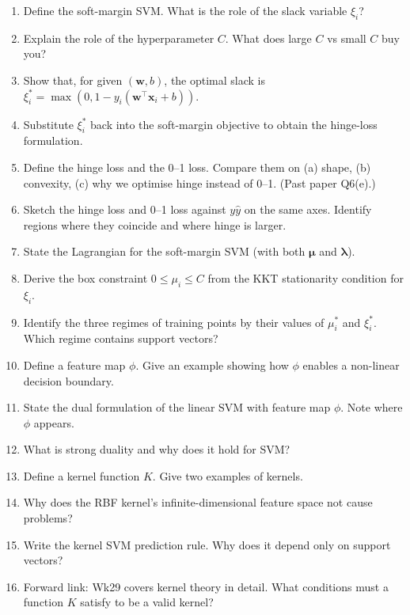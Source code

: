 \documentclass[11pt, a4paper]{article}
\begin{document}
\begin{enumerate}
  \item Define the soft-margin SVM. What is the role of the slack variable $\xi_i$?
  \item Explain the role of the hyperparameter $C$. What does large $C$ vs small $C$ buy you?
  \item Show that, for given $(\mathbf{w}, b)$, the optimal slack is $\xi_i^* = \max(0, 1 - y_i(\mathbf{w}^\top\mathbf{x}_i + b))$.
  \item Substitute $\xi_i^*$ back into the soft-margin objective to obtain the hinge-loss formulation.
  \item Define the hinge loss and the 0--1 loss. Compare them on (a) shape, (b) convexity, (c) why we optimise hinge instead of 0--1. (Past paper Q6(e).)
  \item Sketch the hinge loss and 0--1 loss against $y\hat y$ on the same axes. Identify regions where they coincide and where hinge is larger.
  \item State the Lagrangian for the soft-margin SVM (with both $\boldsymbol\mu$ and $\boldsymbol\lambda$).
  \item Derive the box constraint $0 \le \mu_i \le C$ from the KKT stationarity condition for $\xi_i$.
  \item Identify the three regimes of training points by their values of $\mu_i^*$ and $\xi_i^*$. Which regime contains support vectors?
  \item Define a feature map $\phi$. Give an example showing how $\phi$ enables a non-linear decision boundary.
  \item State the dual formulation of the linear SVM with feature map $\phi$. Note where $\phi$ appears.
  \item What is strong duality and why does it hold for SVM?
  \item Define a kernel function $K$. Give two examples of kernels.
  \item Why does the RBF kernel's infinite-dimensional feature space not cause problems?
  \item Write the kernel SVM prediction rule. Why does it depend only on support vectors?
  \item Forward link: Wk29 covers kernel theory in detail. What conditions must a function $K$ satisfy to be a valid kernel?
\end{enumerate}
\end{document}
